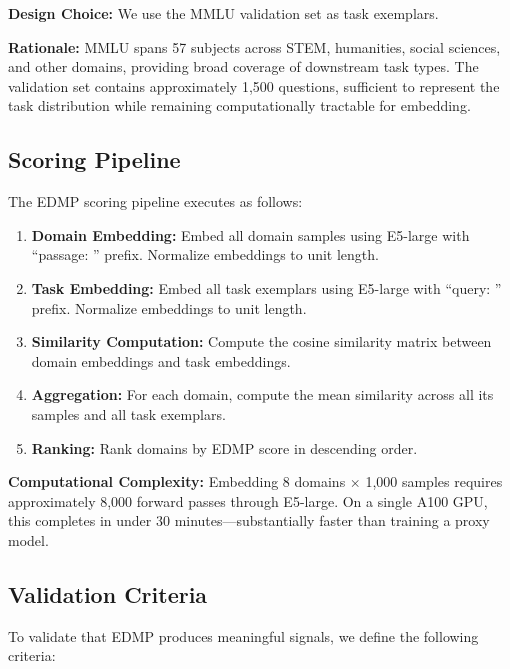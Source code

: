 \textbf{Design Choice:} We use the MMLU validation set as task exemplars.

\textbf{Rationale:} MMLU \citep{hendrycks2021measuring} spans 57 subjects across STEM, humanities, social sciences, and other domains, providing broad coverage of downstream task types. The validation set contains approximately 1,500 questions, sufficient to represent the task distribution while remaining computationally tractable for embedding.

\subsection{Scoring Pipeline}

The EDMP scoring pipeline executes as follows:

\begin{enumerate}
    \item \textbf{Domain Embedding:} Embed all domain samples using E5-large with ``passage: '' prefix. Normalize embeddings to unit length.

    \item \textbf{Task Embedding:} Embed all task exemplars using E5-large with ``query: '' prefix. Normalize embeddings to unit length.

    \item \textbf{Similarity Computation:} Compute the cosine similarity matrix between domain embeddings and task embeddings.

    \item \textbf{Aggregation:} For each domain, compute the mean similarity across all its samples and all task exemplars.

    \item \textbf{Ranking:} Rank domains by EDMP score in descending order.
\end{enumerate}

\textbf{Computational Complexity:} Embedding 8 domains $\times$ 1,000 samples requires approximately 8,000 forward passes through E5-large. On a single A100 GPU, this completes in under 30 minutes---substantially faster than training a proxy model.

\subsection{Validation Criteria}

To validate that EDMP produces meaningful signals, we define the following criteria:

